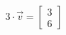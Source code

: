 \documentclass[preview]{standalone}
\begin{document}
\begin{align*}
3 \cdot \vec{v} = \begin{bmatrix} 3 \\ 6 \end{bmatrix}
\end{align*}
\end{document}
